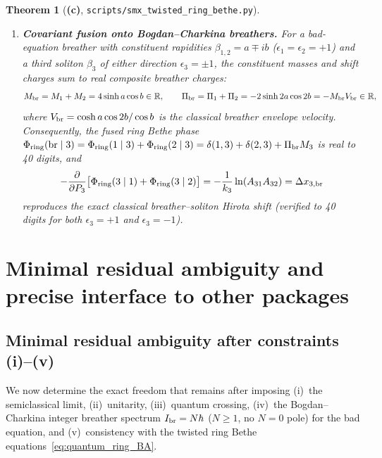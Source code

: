 \documentclass[11pt,a4paper]{article}
\newcommand{\Lc}{\textsf{\textbf{(c)}}}
\newcommand{\smxring}{\texttt{scripts/\allowbreak smx\_\allowbreak twisted\_\allowbreak ring\_\allowbreak bethe.py}}
\newtheorem{theorem}[proposition]{Theorem}
\theoremstyle{remark}
\begin{document}
\begin{theorem}[\Lc, \smxring]
\begin{enumerate}
\begin{equation}\label{eq:global_sum_rule}
\sum_{j=1}^N\mathcal B_j^{\rm ring}=P_{\rm tot}\Lambda+\Pi_{\rm tot}M_{\rm tot}=2\pi\hbar\sum_{j=1}^N n_j,\quad
P_{\rm tot}=\sum_{j=1}^N P_j,\;\; \Pi_{\rm tot}=\sum_{j=1}^N\Pi_j,\;\; M_{\rm tot}=\sum_{j=1}^N M_j.
\end{equation}
This is the exact field-theoretic momentum quantization law for a state of total field momentum $P_{\rm tot}$ and zero-mode momentum $\Pi_{\rm tot}$ in the winding sector $\Delta\phi=M_{\rm tot}$ on $S^1_\Lambda$.
\item \textbf{Covariant fusion onto Bogdan--Charkina breathers.}
For a bad-equation breather with constituent rapidities $\beta_{1,2}=a\mp ib$ ($\epsilon_1=\epsilon_2=+1$) and a third soliton $\beta_3$ of either direction $\epsilon_3=\pm 1$, the constituent masses and shift charges sum to real composite breather charges:
\begin{equation}\label{eq:breather_charges}
M_{\rm br}=M_1+M_2=4\sinh a\cos b\in\mathbb R,\qquad
\Pi_{\rm br}=\Pi_1+\Pi_2=-2\sinh 2a\cos 2b=-M_{\rm br}V_{\rm br}\in\mathbb R,
\end{equation}
where $V_{\rm br}=\cosh a\cos 2b/\cos b$ is the classical breather envelope velocity. Consequently, the fused ring Bethe phase $\Phi_{\rm ring}(\text{br}\mid 3)=\Phi_{\rm ring}(1\mid 3)+\Phi_{\rm ring}(2\mid 3)=\delta(1,3)+\delta(2,3)+\Pi_{\rm br}M_3$ is real to 40 digits, and
\begin{equation}\label{eq:breather_shift}
-\frac{\partial}{\partial P_3}\bigl[\Phi_{\rm ring}(3\mid 1)+\Phi_{\rm ring}(3\mid 2)\bigr]
=-\frac{1}{k_3}\ln(A_{31}A_{32})=\Delta x_{3,\rm br}
\end{equation}
reproduces the exact classical breather--soliton Hirota shift (verified to 40 digits for both $\epsilon_3=+1$ and $\epsilon_3=-1$).
\end{enumerate}
\end{theorem}

\section{Minimal residual ambiguity and precise interface to other packages}\label{sec:interface}

\subsection{Minimal residual ambiguity after constraints (i)--(v)}
We now determine the exact freedom that remains after imposing (i)~the semiclassical limit, (ii)~unitarity, (iii)~quantum crossing, (iv)~the Bogdan--Charkina integer breather spectrum $I_{\rm br}=N\hbar$ ($N\ge 1$, no $N=0$ pole) for the bad equation, and (v)~consistency with the twisted ring Bethe equations~\eqref{eq:quantum_ring_BA}.
\end{document}
